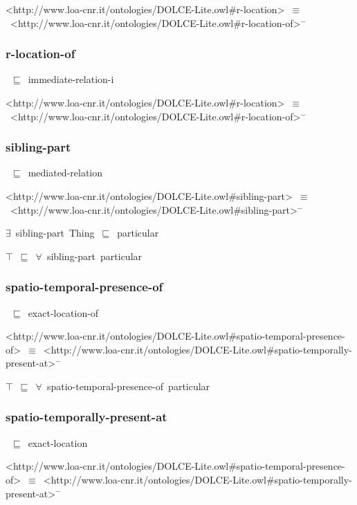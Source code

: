 \documentclass{article}
\begin{document}
<http://www.loa-cnr.it/ontologies/DOLCE-Lite.owl#r-location>~\ensuremath{\equiv}~<http://www.loa-cnr.it/ontologies/DOLCE-Lite.owl#r-location-of>\ensuremath{^-}

\subsubsection*{r-location-of}

~\ensuremath{\sqsubseteq}~immediate-relation-i

<http://www.loa-cnr.it/ontologies/DOLCE-Lite.owl#r-location>~\ensuremath{\equiv}~<http://www.loa-cnr.it/ontologies/DOLCE-Lite.owl#r-location-of>\ensuremath{^-}

\subsubsection*{sibling-part}

~\ensuremath{\sqsubseteq}~mediated-relation

<http://www.loa-cnr.it/ontologies/DOLCE-Lite.owl#sibling-part>~\ensuremath{\equiv}~<http://www.loa-cnr.it/ontologies/DOLCE-Lite.owl#sibling-part>\ensuremath{^-}

\ensuremath{\exists}~sibling-part~Thing~\ensuremath{\sqsubseteq}~particular

\ensuremath{\top}~\ensuremath{\sqsubseteq}~\ensuremath{\forall}~sibling-part~particular

\subsubsection*{spatio-temporal-presence-of}

~\ensuremath{\sqsubseteq}~exact-location-of

<http://www.loa-cnr.it/ontologies/DOLCE-Lite.owl#spatio-temporal-presence-of>~\ensuremath{\equiv}~<http://www.loa-cnr.it/ontologies/DOLCE-Lite.owl#spatio-temporally-present-at>\ensuremath{^-}

\ensuremath{\top}~\ensuremath{\sqsubseteq}~\ensuremath{\forall}~spatio-temporal-presence-of~particular

\subsubsection*{spatio-temporally-present-at}

~\ensuremath{\sqsubseteq}~exact-location

<http://www.loa-cnr.it/ontologies/DOLCE-Lite.owl#spatio-temporal-presence-of>~\ensuremath{\equiv}~<http://www.loa-cnr.it/ontologies/DOLCE-Lite.owl#spatio-temporally-present-at>\ensuremath{^-}
\end{document}
